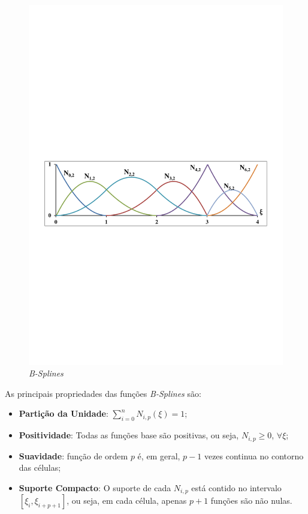 \documentclass[tese_patricia]{subfiles}
\begin{document}
\begin{figure}[htb!]
	\centering 
	\includegraphics[scale=0.7,trim=0cm 11cm 0cm 12cm, clip=true]{Imagens/Cap3/B-splines1.pdf}	
	\caption{\textit{B-Splines}}
	\label{fig:b-splines}
\end{figure}

As principais propriedades das funções \textit{B-Splines} são:

\begin{itemize}
	\item \textbf{Partição da Unidade}: $\sum_{i=0}^{n}N_{i,p}(\xi)=1 $;
	\item \textbf{Positividade}: Todas as funções base são positivas, ou seja, $N_{i,p}\geq0$, $\forall\xi$;
	\item \textbf{Suavidade}: função de ordem $p$ é, em geral, $p-1$ vezes continua no contorno das células;
	\item \textbf{Suporte Compacto}: O suporte de cada $N_{i,p}$ está contido no intervalo $\left[\xi_i,\xi_{i+p+1}\right]$, ou seja, em cada célula, apenas $p+1$ funções são não nulas. %
\end{itemize}
\end{document}
